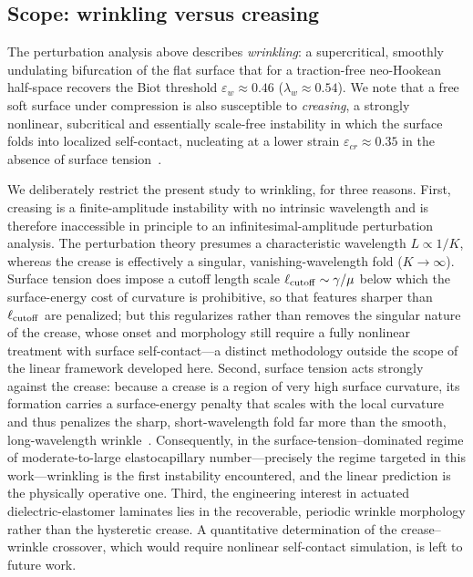 \documentclass[final,3p,times]{elsarticle}
\begin{document}
\subsection{Scope: wrinkling versus creasing}
\label{sec:crease_wrinkle}

The perturbation analysis above describes \emph{wrinkling}: a supercritical, smoothly undulating bifurcation of the flat surface that for a traction-free neo-Hookean half-space recovers the Biot threshold $\varepsilon_{w}\approx0.46$ ($\lambda_w\approx0.54$). We note that a free soft surface under compression is also susceptible to \emph{creasing}, a strongly nonlinear, subcritical and essentially scale-free instability in which the surface folds into localized self-contact, nucleating at a lower strain $\varepsilon_{cr}\approx0.35$ in the absence of surface tension~\citep{hong2009formation,jin2014creases,cai2012creasing,hong2013crease}.

We deliberately restrict the present study to wrinkling, for three reasons. First, creasing is a finite-amplitude instability with no intrinsic wavelength and is therefore inaccessible in principle to an infinitesimal-amplitude perturbation analysis. The perturbation theory presumes a characteristic wavelength $L\propto1/K$, whereas the crease is effectively a singular, vanishing-wavelength fold ($K\to\infty$). Surface tension does impose a cutoff length scale $\ell_{\rm cutoff}\sim\gamma/\mu$ below which the surface-energy cost of curvature is prohibitive, so that features sharper than $\ell_{\rm cutoff}$ are penalized; but this regularizes rather than removes the singular nature of the crease, whose onset and morphology still require a fully nonlinear treatment with surface self-contact---a distinct methodology outside the scope of the linear framework developed here. Second, surface tension acts strongly against the crease: because a crease is a region of very high surface curvature, its formation carries a surface-energy penalty that scales with the local curvature and thus penalizes the sharp, short-wavelength fold far more than the smooth, long-wavelength wrinkle~\citep{chenPRL2012}. Consequently, in the surface-tension--dominated regime of moderate-to-large elastocapillary number---precisely the regime targeted in this work---wrinkling is the first instability encountered, and the linear prediction is the physically operative one. Third, the engineering interest in actuated dielectric-elastomer laminates lies in the recoverable, periodic wrinkle morphology rather than the hysteretic crease. A quantitative determination of the crease--wrinkle crossover, which would require nonlinear self-contact simulation, is left to future work.
\end{document}
